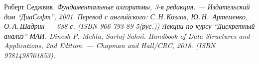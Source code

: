 \begin{thebibliography}{99}
Роберт Седжвик. \itshape{Фундаментальные алгоритмы, 3-я редакция}. --- Издательский дом \enquote{ДиаСофт}, 2001. Перевод с английского: С.\,Н.\,Козлов, Ю.\,Н.\, Артеменко, О.\,А.\,Шадрин --- 688 с. (ISBN 966-793-89-5(рус.))
\itshape{Лекции по курсу \enquote{Дискретный анализ} МАИ.}
Dinesh P. Mehta, Sartaj Sahni. \itshape{Handbook of Data Structures and Applications, 2nd Edition}. --- Chapman and Hall/CRC, 2018. (ISBN 9781498701853).
\end{thebibliography}
\pagebreak


